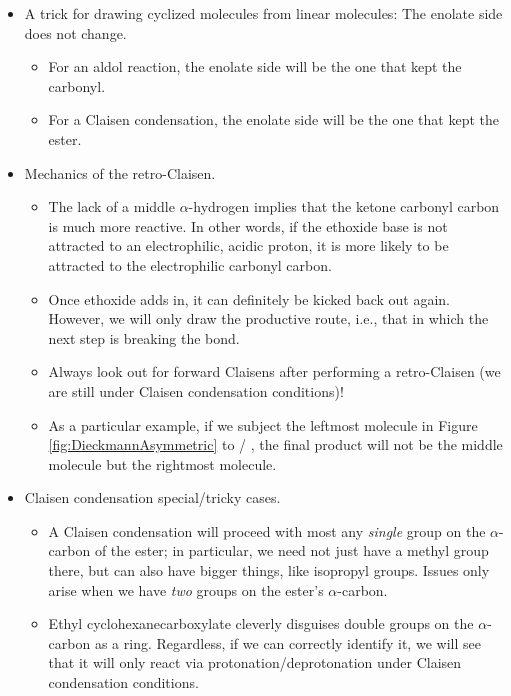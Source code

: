 \documentclass[../notes.tex]{subfiles}
\begin{document}
\begin{itemize}
\begin{itemize}
\begin{itemize}
        \end{itemize}
        \item A trick for drawing cyclized molecules from linear molecules: The enolate side does not change.
        \begin{itemize}
            \item For an aldol reaction, the enolate side will be the one that kept the carbonyl.
            \item For a Claisen condensation, the enolate side will be the one that kept the ester.
        \end{itemize}
        \item Mechanics of the retro-Claisen.
        \begin{itemize}
            \item The lack of a middle $\alpha$-hydrogen implies that the ketone carbonyl carbon is much more reactive. In other words, if the ethoxide base is not attracted to an electrophilic, acidic proton, it is more likely to be attracted to the electrophilic carbonyl carbon.
            \item Once ethoxide adds in, it can definitely be kicked back out again. However, we will only draw the productive route, i.e., that in which the next step is breaking the  bond.
            \item Always look out for forward Claisens after performing a retro-Claisen (we are still under Claisen condensation conditions)!
            \item As a particular example, if we subject the leftmost molecule in Figure \ref{fig:DieckmannAsymmetric} to  / , the final product will not be the middle molecule but the rightmost molecule.
        \end{itemize}
        \item Claisen condensation special/tricky cases.
        \begin{itemize}
            \item A Claisen condensation will proceed with most any \emph{single}  group on the $\alpha$-carbon of the ester; in particular, we need not just have a methyl group there, but can also have bigger things, like isopropyl groups. Issues only arise when we have \emph{two}  groups on the ester's $\alpha$-carbon.
            \item Ethyl cyclohexanecarboxylate cleverly disguises double  groups on the $\alpha$-carbon as a ring. Regardless, if we can correctly identify it, we will see that it will only react via protonation/deprotonation under Claisen condensation conditions.

\end{itemize}
\end{itemize}
\end{itemize}
\end{document}
